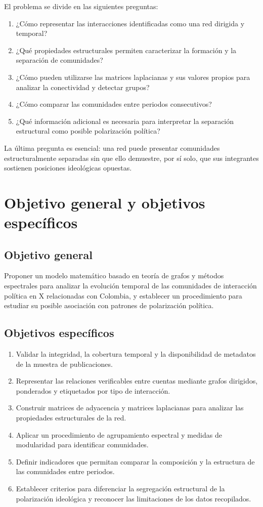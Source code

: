 \documentclass[journal]{IEEEtran}
\begin{document}
El problema se divide en las siguientes preguntas:
\begin{enumerate}
\item ¿Cómo representar las interacciones identificadas como una red dirigida y temporal?
\item ¿Qué propiedades estructurales permiten caracterizar la formación y la separación de comunidades?
\item ¿Cómo pueden utilizarse las matrices laplacianas y sus valores propios para analizar la conectividad y detectar grupos?
\item ¿Cómo comparar las comunidades entre periodos consecutivos?
\item ¿Qué información adicional es necesaria para interpretar la separación estructural como posible polarización política?
\end{enumerate}
La última pregunta es esencial: una red puede presentar comunidades estructuralmente separadas sin que ello demuestre, por sí solo, que sus integrantes sostienen posiciones ideológicas opuestas.

\section{Objetivo general y objetivos específicos}
\subsection{Objetivo general}
Proponer un modelo matemático basado en teoría de grafos y métodos espectrales para analizar la evolución temporal de las comunidades de interacción política en X relacionadas con Colombia, y establecer un procedimiento para estudiar su posible asociación con patrones de polarización política.
\subsection{Objetivos específicos}
\begin{enumerate}
\item Validar la integridad, la cobertura temporal y la disponibilidad de metadatos de la muestra de publicaciones.
\item Representar las relaciones verificables entre cuentas mediante grafos dirigidos, ponderados y etiquetados por tipo de interacción.
\item Construir matrices de adyacencia y matrices laplacianas para analizar las propiedades estructurales de la red.
\item Aplicar un procedimiento de agrupamiento espectral y medidas de modularidad para identificar comunidades.
\item Definir indicadores que permitan comparar la composición y la estructura de las comunidades entre periodos.
\item Establecer criterios para diferenciar la segregación estructural de la polarización ideológica y reconocer las limitaciones de los datos recopilados.
\end{enumerate}
\end{document}
